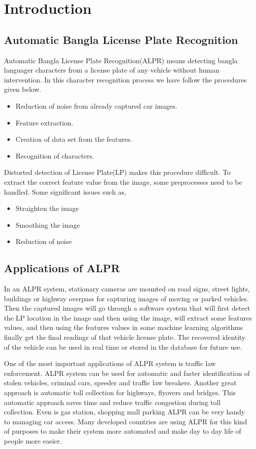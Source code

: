 \chapter{Introduction}\label{intro}


\section{Automatic Bangla License Plate Recognition}
Automatic Bangla License Plate Recognition(ALPR)  means detecting bangla languager characters from a license plate of any vehicle without human intervention. In this character recognition process we have follow the procedures given below.
\begin{itemize}
\item Reduction of noise from already captured car images.
\item Feature extraction.
\item Creation of data set from the features.
\item Recognition of characters.
\end{itemize}

Distorted detection of License Plate(LP) makes this procedure difficult. To extract the correct feature value from the image, some preprocesses need to be handled. Some significant issues such as,
\begin{itemize}

\item Straighten the image
\item Smoothing the image
\item Reduction of noise
\end{itemize}
\section{Applications of ALPR}
In an ALPR system, stationary cameras are mounted on road signs, street lights, buildings or highway  overpass for capturing images of moving or parked vehicles. Then the captured images will go through a software system that will first detect the LP location in the image  and then using the image, will extract some features values, and then using the features values in some machine learning algorithms finally get the final readings of that vehicle license plate. The recovered identity of the vehicle can be used in real time or stored in the database for future use.

One of the most important applications of ALPR system is traffic law enforcement. ALPR system can be used for automatic and faster identification of stolen vehicles, criminal cars, speeder and traffic law breakers. Another great approach is automatic toll collection for highways, flyovers and bridges. This automatic approach saves time and reduce traffic congestion during toll collection. Even is gas station, shopping  mall parking ALPR can be very handy to managing car access. Many developed countries are using ALPR for this kind of purposes to make their system more automated and make day to day life of people more easier. 


